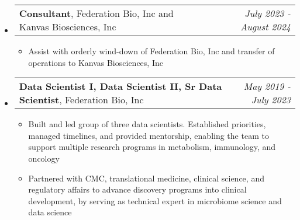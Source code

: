 \documentclass[letterpaper,10pt]{article}
\makeatletter
\newcommand{\ressubheadingSingular}[2]{
\begin{tabular*}{7in}{l@{\cftdotfill{\cftsecdotsep}\extracolsep{\fill}}r}
		#1 & \textit{#2} \\
\end{tabular*}\vspace{-6pt}}
\makeatother
\begin{document}
\begin{itemize}
	\item
		\ressubheadingSingular{\textbf{Consultant}, Federation Bio, Inc and Kanvas Biosciences, Inc}{July 2023 - August 2024}
		\begin{itemize}
			\item Assist with orderly wind-down of Federation Bio, Inc and transfer of operations to Kanvas Biosciences, Inc
		\end{itemize}

	\item
		\ressubheadingSingular{\textbf{Data Scientist I, Data Scientist II, Sr Data Scientist}, Federation Bio, Inc}{May 2019 - July 2023}
		\begin{itemize}
		
			\item Built and led group of three data scientists. Established priorities, managed timelines, and provided mentorship, enabling the team to support multiple research programs in metabolism, immunology, and oncology
			\item Partnered with CMC, translational medicine, clinical science, and regulatory affairs to advance discovery programs into clinical development, by serving as technical expert in microbiome science and data science


\end{itemize}
\end{itemize}
\end{document}
